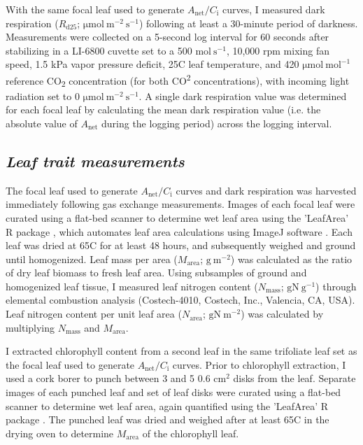 With the same focal leaf used to generate $A_\mathrm{{net}}/C_\mathrm{i}$ curves, I measured dark respiration ($R_\mathrm{{d25}}$; $\mathrm{\mu mol\ m^{-2}\ s^{-1}}$) following at least a 30-minute period of darkness. Measurements were collected on a 5-second log interval for 60 seconds after stabilizing in a LI-6800 cuvette set to a 500 $\mathrm{mol\ s^{-1}}$, 10,000 rpm mixing fan speed, 1.5 kPa vapor pressure deficit, 25\textdegree{}C leaf temperature, and 420 $\mathrm{\mu mol\ mol^{-1}}$ reference CO\textsubscript{2} concentration (for both CO\textsuperscript{2} concentrations), with incoming light radiation set to 0 $\mathrm{\mu mol\ m^{-2}\ s^{-1}}$. A single dark respiration value was determined for each focal leaf by calculating the mean dark respiration value (i.e. the absolute value of $A_\mathrm{{net}}$ during the logging period) across the logging interval.

\subsection{\textit{Leaf trait measurements}}
The focal leaf used to generate $A_\mathrm{{net}}/C_\mathrm{i}$ curves and dark respiration was harvested immediately following gas exchange measurements. Images of each focal leaf were curated using a flat-bed scanner to determine wet leaf area using the 'LeafArea' R package , which automates leaf area calculations using ImageJ software . Each leaf was dried at 65\textdegree{}C for at least 48 hours, and subsequently weighed and ground until homogenized. Leaf mass per area ($M_\mathrm{area}$; $\mathrm{g\ m^{-2}}$) was calculated as the ratio of dry leaf biomass to fresh leaf area. Using subsamples of ground and homogenized leaf tissue, I measured leaf nitrogen content ($N_\mathrm{mass}$; $\mathrm{g N\ g^{-1}}$) through elemental combustion analysis (Costech-4010, Costech, Inc., Valencia, CA, USA). Leaf nitrogen content per unit leaf area ($N_\mathrm{area}$; $\mathrm{g N\ m^{-2}}$) was calculated by multiplying $N_\mathrm{mass}$ and $M_\mathrm{area}$.

I extracted chlorophyll content from a second leaf in the same trifoliate leaf set as the focal leaf used to generate $A_\mathrm{{net}}/C_\mathrm{i}$ curves. Prior to chlorophyll extraction, I used a cork borer to punch between 3 and 5 0.6 $\mathrm{cm^{2}}$ disks from the leaf. Separate images of each punched leaf and set of leaf disks were curated using a flat-bed scanner to determine wet leaf area, again quantified using the 'LeafArea' R package . The punched leaf was dried and weighed after at least 65\textdegree{}C in the drying oven to determine $M_\mathrm{area}$ of the chlorophyll leaf.
    
